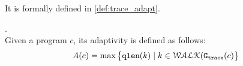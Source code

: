 %
It is formally defined in \ref{def:trace_adapt}.
%
\begin{defn}
    .
    \label{def:trace_adapt}
    \\
    Given a program ${c}$, 
    its adaptivity is defined as follows:
    $$
    A(c) = \max \big 
    \{ \mathtt{qlen}(k) \mid k \in \mathcal{WALK}(\mathtt{{G_{trace}}}(c) \big \} 
    $$
    \end{defn}
%
%
%
%
%
%
%
%
% 
%
\clearpage
